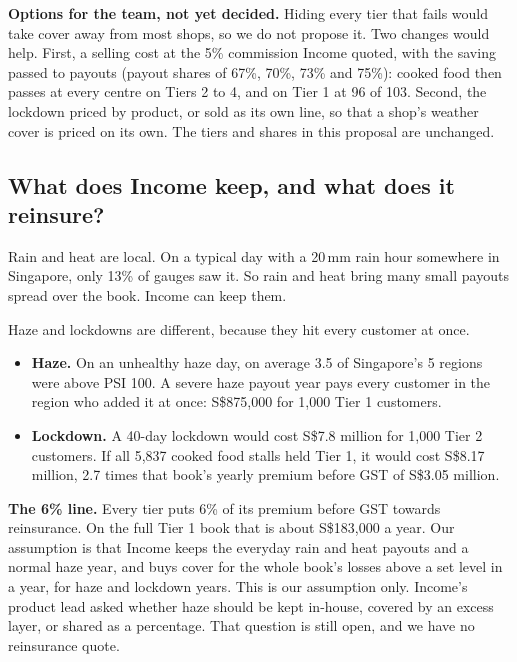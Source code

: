 \documentclass[11pt,a4paper]{article}
\newcommand{\sgd}{\textup{S\$}}
\begin{document}
\textbf{Options for the team, not yet decided.} Hiding every tier that fails would take cover away from most shops, so we do not propose it. Two changes would help. First, a selling cost at the 5\% commission Income quoted,\cite{income-qa} with the saving passed to payouts (payout shares of 67\%, 70\%, 73\% and 75\%): cooked food then passes at every centre on Tiers 2 to 4, and on Tier 1 at 96 of 103. Second, the lockdown priced by product, or sold as its own line, so that a shop's weather cover is priced on its own. The tiers and shares in this proposal are unchanged.

\subsection{What does Income keep, and what does it reinsure?}\label{sec:retention}

Rain and heat are local. On a typical day with a 20\,mm rain hour somewhere in Singapore, only 13\% of gauges saw it.\cite{team-data} So rain and heat bring many small payouts spread over the book. Income can keep them.

Haze and lockdowns are different, because they hit every customer at once.
\begin{itemize}[leftmargin=1.2em]
  \item \textbf{Haze.} On an unhealthy haze day, on average 3.5 of Singapore's 5 regions were above PSI 100.\cite{team-data} A severe haze payout year pays every customer in the region who added it at once: \sgd 875,000 for 1,000 Tier 1 customers.
  \item \textbf{Lockdown.} A 40-day lockdown would cost \sgd 7.8 million for 1,000 Tier 2 customers. If all 5,837 cooked food stalls held Tier 1, it would cost \sgd 8.17 million, 2.7 times that book's yearly premium before GST of \sgd 3.05 million.
\end{itemize}

\textbf{The 6\% line.} Every tier puts 6\% of its premium before GST towards reinsurance. On the full Tier 1 book that is about \sgd 183,000 a year. Our assumption is that Income keeps the everyday rain and heat payouts and a normal haze year, and buys cover for the whole book's losses above a set level in a year, for haze and lockdown years. This is our assumption only. Income's product lead asked whether haze should be kept in-house, covered by an excess layer, or shared as a percentage. That question is still open, and we have no reinsurance quote.
\end{document}
